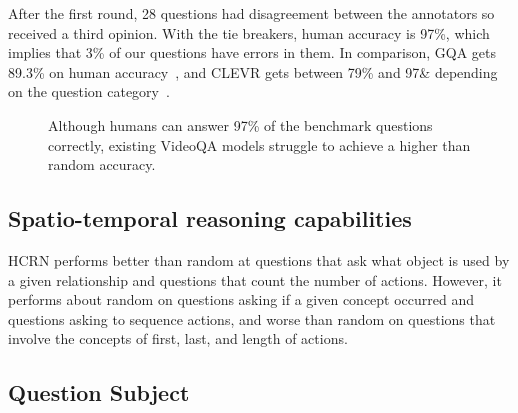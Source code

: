 \documentclass[10pt,twocolumn,letterpaper]{article}
\newcommand{\mgm}[1]{{\color{cyan}{mgm: #1}}}
\begin{document}
After the first round, 28 questions had disagreement between the annotators so received a third opinion. With the tie breakers, human accuracy is 97\%, which implies that 3\% of our questions have errors in them. In comparison, GQA gets 89.3\% on human accuracy~\cite{hudson2019gqa}, and CLEVR gets between 79\% and 97\& depending on the question category~\cite{johnson2017clevr}. 





%

\begin{figure}[t]
\begin{center}
\resizebox{\linewidth}{!}{

}
\end{center}
   \caption{Although humans can answer 97\% of the benchmark questions correctly, existing VideoQA models struggle to achieve a higher than random accuracy.}
\label{table:global}
\end{figure}



\subsection{Spatio-temporal reasoning capabilities}
HCRN performs better than random at questions that ask what object is used by a given relationship and questions that count the number of actions. However, it performs about random on questions asking if a given concept occurred and questions asking to sequence actions, and worse than random on questions that involve the concepts of first, last, and length of actions. 



\textbf{}
\subsection{Question Subject}
\end{document}
